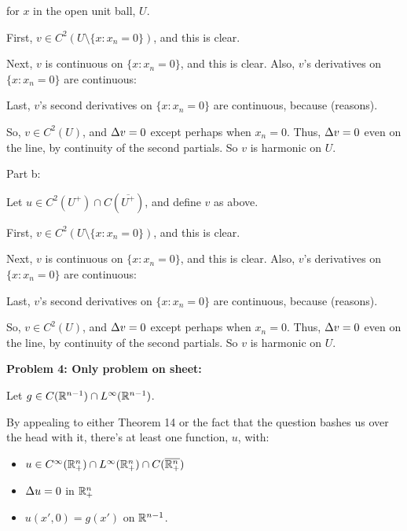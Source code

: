 \documentclass[a4paper,12pt]{article}
\begin{document}
for $x$ in the open unit ball, $U$.

First, $v \in C^2( U \setminus \{x: x_n = 0\})$, and this is clear.

Next, $v$ is continuous on $\{x: x_n = 0\}$, and this is clear. Also, $v$'s derivatives on $\{x: x_n = 0\}$ are continuous: %

Last, $v$'s second derivatives on $\{x: x_n = 0\}$ are continuous, because (reasons). %

So, $v \in C^2(U)$, and $\Delta v = 0$ except perhaps when $x_n = 0$. Thus, $\Delta v = 0$ even on the line, by continuity of the second partials. So $v$ is harmonic on $U$.

\shunt

Part b:

Let $u \in C^2(U^+) \cap C(\overline{U^+})$, and define $v$ as above.

First, $v \in C^2( U \setminus \{x: x_n = 0\})$, and this is clear.

Next, $v$ is continuous on $\{x: x_n = 0\}$, and this is clear. Also, $v$'s derivatives on $\{x: x_n = 0\}$ are continuous: %

Last, $v$'s second derivatives on $\{x: x_n = 0\}$ are continuous, because (reasons). %

So, $v \in C^2(U)$, and $\Delta v = 0$ except perhaps when $x_n = 0$. Thus, $\Delta v = 0$ even on the line, by continuity of the second partials. So $v$ is harmonic on $U$.

\shunt

{\bf Problem 4: Only problem on sheet:}

Let $g \in C(\mathbb{R}^{n-1}) \cap L^\infty (\mathbb{R}^{n-1})$.

By appealing to either Theorem 14 or the fact that the question bashes us over the head with it, there's at least one function, $u$, with:

\begin{itemize}
\item $u \in C^\infty( \mathbb{R}^n_+) \cap L^\infty  (\mathbb{R}^n_+) \cap C(\overline{\mathbb{R}^n_+})$
\item $\Delta u = 0$ in $\mathbb{R}^n_+$
\item $u(x',0) = g(x')$ on $\mathbb{R}^{n-1}$.
\end{itemize}
\end{document}
